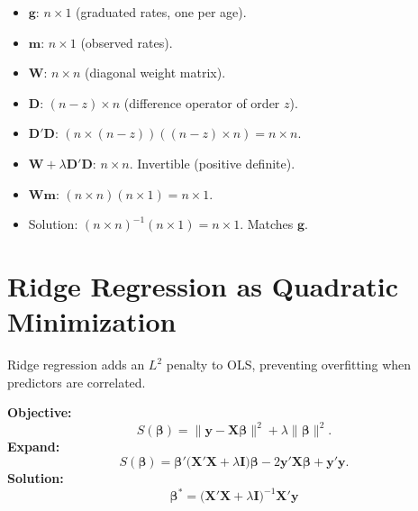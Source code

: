 \documentclass[11pt,a4paper]{article}
\begin{document}
\begin{dimcheck}
\begin{itemize}[nosep]
\item $\bm{g}$: $n \times 1$ (graduated rates, one per age).
\item $\bm{m}$: $n \times 1$ (observed rates).
\item $\bm{W}$: $n \times n$ (diagonal weight matrix).
\item $\bm{D}$: $(n-z) \times n$ (difference operator of order $z$).
\item $\bm{D}'\bm{D}$: $(n \times (n-z))((n-z) \times n) = n \times n$.
\item $\bm{W} + \lambda\bm{D}'\bm{D}$: $n \times n$. Invertible (positive definite).
\item $\bm{W}\bm{m}$: $(n \times n)(n \times 1) = n \times 1$.
\item Solution: $(n \times n)^{-1}(n \times 1) = n \times 1$. Matches $\bm{g}$.
\end{itemize}
\end{dimcheck}

\section{Ridge Regression as Quadratic Minimization}

Ridge regression adds an $L^2$ penalty to OLS, preventing overfitting when predictors are correlated.

\begin{formaldef}
\textbf{Objective:}
\[
S(\bm{\beta}) = \|\bm{y} - \bm{X}\bm{\beta}\|^2 + \lambda\|\bm{\beta}\|^2.
\]
\textbf{Expand:}
\[
S(\bm{\beta}) = \bm{\beta}'\bigl(\bm{X}'\bm{X} + \lambda\bm{I}\bigr)\bm{\beta} - 2\bm{y}'\bm{X}\bm{\beta} + \bm{y}'\bm{y}.
\]
\textbf{Solution:}
\[
\boxed{\bm{\beta}^* = \bigl(\bm{X}'\bm{X} + \lambda\bm{I}\bigr)^{-1}\bm{X}'\bm{y}}
\]
\end{formaldef}
\end{document}
